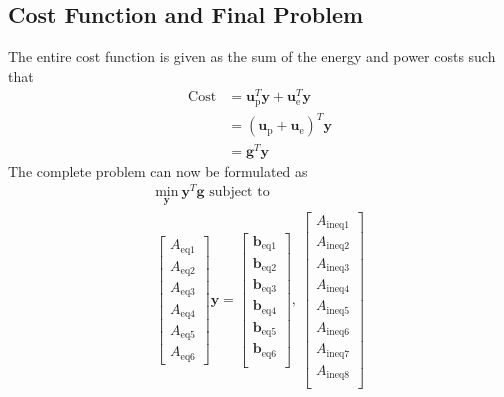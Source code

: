 \subsection{Cost Function and Final Problem}
The entire cost function is given as the sum of the energy and power costs such that
\begin{equation}\begin{aligned}
	\text{Cost} &= \mathbf{u}_{\text{p}}^T\mathbf{y} + \mathbf{u}_{\text{e}}^T\mathbf{y} \\
	            &= \left( \mathbf{u}_{\text{p}} + \mathbf{u}_{\text{e}} \right )^T\mathbf{y} \\
		    &= \mathbf{g}^T\mathbf{y}
\end{aligned}\end{equation}
The complete problem can now be formulated as
\begin{equation}\begin{matrix}
	\underset{\mathbf{y}}{\text{min}} \ \mathbf{y}^T\mathbf{g} \text{ subject to } \\
	\begin{bmatrix}
		A_{\text{eq1}} \\ 
		A_{\text{eq2}} \\
		A_{\text{eq3}} \\
		A_{\text{eq4}} \\
		A_{\text{eq5}} \\
		A_{\text{eq6}}
	\end{bmatrix}\mathbf{y} = 
	\begin{bmatrix}
		\mathbf{b}_{\text{eq1}} \\
		\mathbf{b}_{\text{eq2}} \\
		\mathbf{b}_{\text{eq3}} \\
		\mathbf{b}_{\text{eq4}} \\
		\mathbf{b}_{\text{eq5}} \\
		\mathbf{b}_{\text{eq6}} \\
	\end{bmatrix}, \ 
	 \begin{bmatrix}
		A_{\text{ineq1}} \\
		A_{\text{ineq2}} \\
		A_{\text{ineq3}} \\
		A_{\text{ineq4}} \\
		A_{\text{ineq5}} \\
		A_{\text{ineq6}} \\
		A_{\text{ineq7}} \\
		A_{\text{ineq8}} \\

\end{bmatrix}
\end{matrix}
\end{equation}
